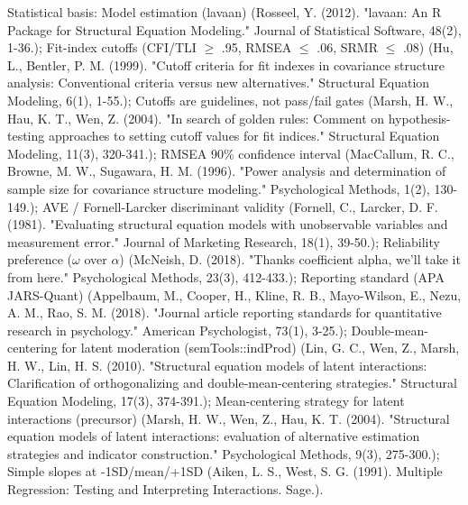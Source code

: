 \documentclass{article}
\begin{document}
Statistical basis: Model estimation (lavaan) (Rosseel, Y. (2012). "lavaan: An R Package for Structural Equation Modeling." Journal of Statistical Software, 48(2), 1-36.); Fit-index cutoffs (CFI/TLI $\ge$ .95, RMSEA $\le$ .06, SRMR $\le$ .08) (Hu, L., Bentler, P. M. (1999). "Cutoff criteria for fit indexes in covariance structure analysis: Conventional criteria versus new alternatives." Structural Equation Modeling, 6(1), 1-55.); Cutoffs are guidelines, not pass/fail gates (Marsh, H. W., Hau, K. T., Wen, Z. (2004). "In search of golden rules: Comment on hypothesis-testing approaches to setting cutoff values for fit indices." Structural Equation Modeling, 11(3), 320-341.); RMSEA 90\% confidence interval (MacCallum, R. C., Browne, M. W., Sugawara, H. M. (1996). "Power analysis and determination of sample size for covariance structure modeling." Psychological Methods, 1(2), 130-149.); AVE / Fornell-Larcker discriminant validity (Fornell, C., Larcker, D. F. (1981). "Evaluating structural equation models with unobservable variables and measurement error." Journal of Marketing Research, 18(1), 39-50.); Reliability preference ($\omega$ over $\alpha$) (McNeish, D. (2018). "Thanks coefficient alpha, we'll take it from here." Psychological Methods, 23(3), 412-433.); Reporting standard (APA JARS-Quant) (Appelbaum, M., Cooper, H., Kline, R. B., Mayo-Wilson, E., Nezu, A. M., Rao, S. M. (2018). "Journal article reporting standards for quantitative research in psychology." American Psychologist, 73(1), 3-25.); Double-mean-centering for latent moderation (semTools::indProd) (Lin, G. C., Wen, Z., Marsh, H. W., Lin, H. S. (2010). "Structural equation models of latent interactions: Clarification of orthogonalizing and double-mean-centering strategies." Structural Equation Modeling, 17(3), 374-391.); Mean-centering strategy for latent interactions (precursor) (Marsh, H. W., Wen, Z., Hau, K. T. (2004). "Structural equation models of latent interactions: evaluation of alternative estimation strategies and indicator construction." Psychological Methods, 9(3), 275-300.); Simple slopes at -1SD/mean/+1SD (Aiken, L. S., West, S. G. (1991). Multiple Regression: Testing and Interpreting Interactions. Sage.).
\end{document}
